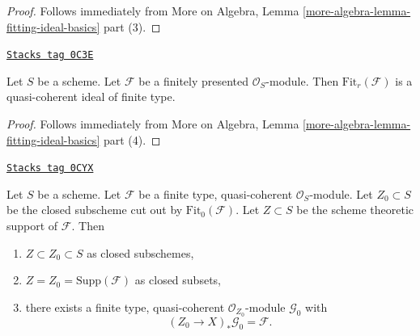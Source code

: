 \begin{proof}
Follows immediately from More on Algebra, Lemma
\ref{more-algebra-lemma-fitting-ideal-basics} part (3).
\end{proof}

\begin{lemma}
\label{divisors-lemma-fitting-ideal-of-finitely-presented}
\href{https://stacks.math.columbia.edu/tag/0C3E}{\texttt{Stacks tag 0C3E}}

Let $S$ be a scheme.
Let $\mathcal{F}$ be a finitely presented $\mathcal{O}_S$-module.
Then $\text{Fit}_r(\mathcal{F})$ is a quasi-coherent ideal of finite type.
\end{lemma}

\begin{proof}
Follows immediately from More on Algebra, Lemma
\ref{more-algebra-lemma-fitting-ideal-basics} part (4).
\end{proof}

\begin{lemma}
\label{divisors-lemma-on-subscheme-cut-out-by-Fit-0}
\href{https://stacks.math.columbia.edu/tag/0CYX}{\texttt{Stacks tag 0CYX}}

Let $S$ be a scheme.
Let $\mathcal{F}$ be a finite type, quasi-coherent $\mathcal{O}_S$-module.
Let $Z_0 \subset S$ be the closed subscheme cut out by
$\text{Fit}_0(\mathcal{F})$.
Let $Z \subset S$ be the scheme theoretic support of $\mathcal{F}$.
Then
\begin{enumerate}
\item $Z \subset Z_0 \subset S$ as closed subschemes,
\item $Z = Z_0 = \text{Supp}(\mathcal{F})$ as closed subsets,
\item there exists a finite type, quasi-coherent $\mathcal{O}_{Z_0}$-module
$\mathcal{G}_0$ with
$$
(Z_0 \to X)_*\mathcal{G}_0 = \mathcal{F}.
$$
\end{enumerate}
\end{lemma}

